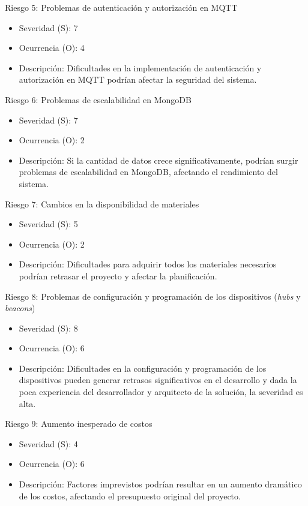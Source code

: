 \documentclass[
11pt, %
]{charter}
\begin{document}
Riesgo 5: Problemas de autenticación y autorización en MQTT
\begin{itemize}
	\item Severidad (S): 7
	\item Ocurrencia (O): 4
	\item Descripción: Dificultades en la implementación de autenticación y autorización en MQTT podrían afectar la seguridad del sistema.
\end{itemize}

Riesgo 6: Problemas de escalabilidad en MongoDB
\begin{itemize}
	\item Severidad (S): 7
	\item Ocurrencia (O): 2
	\item Descripción: Si la cantidad de datos crece significativamente, podrían surgir problemas de escalabilidad en MongoDB, afectando el rendimiento del sistema.
\end{itemize}

Riesgo 7: Cambios en la disponibilidad de materiales
\begin{itemize}
	\item Severidad (S): 5
	\item Ocurrencia (O): 2
	\item Descripción: Dificultades para adquirir todos los materiales necesarios podrían retrasar el proyecto y afectar la planificación.
\end{itemize}

Riesgo 8: Problemas de configuración y programación de los dispositivos (\textit{hubs} y \textit{beacons})
\begin{itemize}
	\item Severidad (S): 8
	\item Ocurrencia (O): 6
	\item Descripción: Dificultades en la configuración y programación de los dispositivos pueden generar retrasos significativos en el desarrollo y dada la poca experiencia del desarrollador y arquitecto de la solución, la severidad es alta.
\end{itemize}

Riesgo 9: Aumento inesperado de costos
\begin{itemize}
	\item Severidad (S): 4
	\item Ocurrencia (O): 6
	\item Descripción: Factores imprevistos podrían resultar en un aumento dramático de los costos, afectando el presupuesto original del proyecto.
\end{itemize}
\end{document}
